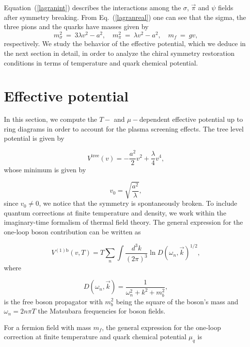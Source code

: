 \documentclass[%
 reprint,
showpacs,preprintnumbers,
 amsmath,amssymb,
onecolumn]{revtex4}
\begin{document}
Equation~(\ref{lagranint}) describes the interactions among the $\sigma$, $\vec{\pi}$ and $\psi$ fields after symmetry breaking. From Eq.~(\ref{lagranreal}) one can see that the sigma, the three pions and the quarks have masses given by
\begin{equation}
  m^{2}_{\sigma}\ =\ 3  \lambda v^{2}-a^{2},\quad  m^{2}_{\pi}\ =\ \lambda v^{2}-a^{2},\quad  m_{f}\ =\ gv,
\label{masses}
\end{equation}
respectively. We study the behavior of the effective potential, which we deduce in the next section in detail, in order to analyze the chiral symmetry restoration conditions in terms of temperature and quark chemical potential.

\section{\label{EffPot}Effective potential}
In this section, we compute the $T-$ and $\mu-$dependent effective potential up to ring diagrams in order to account for the plasma screening effects. The tree level potential is given by

\begin{equation}
    V^{\text{tree}}(v)=-\frac{a^2}{2}v^2+\frac{\lambda}{4}v^4,
    \label{treelevel}
\end{equation}
whose minimum is given by

\begin{equation}
    v_0=\sqrt{\frac{a^2}{\lambda}},
\end{equation}
since $v_0\neq 0$, we notice that the symmetry is spontaneously broken. To include quantum corrections at finite temperature and density, we work within the imaginary-time formalism of thermal field theory. The general expression for the one-loop boson contribution can be written as

\begin{equation}
    V^{(1)\text{b}}(v,T)=T\sum_n\int\frac{d^3k}{(2\pi)^3} \ln D(\omega_n,\vec{k})^{1/2},
    \label{1loopboson}
\end{equation}
where

\begin{equation}
D(\omega_n,\vec{k})=\frac{1}{\omega_n^2+k^2+m_b^2},
\end{equation} 
is the free boson propagator with $m_b^2$ being the square of the boson's mass and $\omega_n=2n\pi T$ the Matsubara frequencies for boson fields. 

For a fermion field with mass $m_f$, the general expression for the one-loop correction at finite temperature and quark chemical potential $\mu_q$ is
\end{document}
